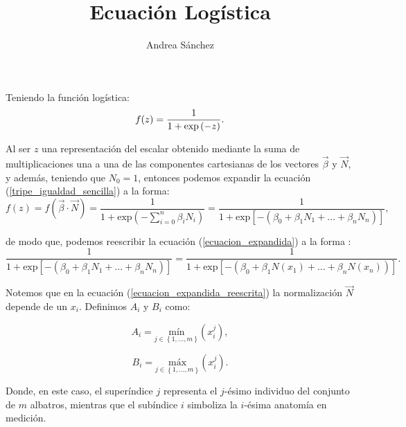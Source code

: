 \documentclass{article}
\begin{document}
\title{Ecuación Logística}
\author{Andrea Sánchez}
\maketitle
\begin{flushleft}

Teniendo la función logística:
\begin{equation}
    \label{tripe_igualdad_sencilla}
    f(z) = \frac{1}{1+\mbox{\mbox{exp}}\left ( -z\right )}.
\end{equation}

Al ser $z$ una representación del escalar obtenido mediante la suma de multiplicaciones una a una de las componentes cartesianas de los vectores $\vec{\beta}$ y $\vec{N}$, y además, teniendo que $N_{0}=1$, entonces podemos expandir la ecuación (\ref{tripe_igualdad_sencilla}) a la forma:
\begin{equation}
    \label{ecuacion_expandida}
    f(z) = f(\vec{\beta} \cdot \vec{N}) = \frac{1}{1+\mbox{exp}\left (-\sum_{i=0}^{n} \beta _{i}N_{i} \right )} = \frac{1}{1+\mbox{exp}\left [ -\left ( \beta _{0} + \beta _{1}N_{1}+...+\beta_{n}N_{n} \right ) \right ]} ,
\end{equation}

de modo que, podemos reescribir la ecuación (\ref{ecuacion_expandida}) a la forma :
\begin{equation}
    \label{ecuacion_expandida_reescrita}
    \frac{1}{1+\mbox{exp}\left [ -\left ( \beta _{0} + \beta _{1}N_{1}+...+\beta_{n}N_{n} \right ) \right ]} = \frac{1}{1+\mbox{exp}\left [ -\left ( \beta _{0} + \beta _{1}N(x_{1})+...+\beta_{n}N(x_{n})\right ) \right ]} .
\end{equation}

Notemos que en la ecuación (\ref{ecuacion_expandida_reescrita}) la normalización $\vec{N}$ depende de un $x_{i}$. Definimos $A_{i}$ y $B_{i}$ como:

\begin{equation}
    \label{maximos_A}
    A_{i}= \underset{j\in \left \{ 1,...,m \right \}}{\mbox{mín}}\left ( x_{i}^{j} \right ) ,
\end{equation}

\begin{equation}
    \label{minimos_B}
    B_{i}= \underset{j\in \left \{ 1,...,m \right \}}{\mbox{máx}}\left ( x_{i}^{j} \right ) .
\end{equation}

Donde, en este caso, el superíndice $j$ representa el $j$-ésimo individuo del conjunto de $m$ albatros, mientras que el subíndice $i$ simboliza la $i$-ésima anatomía en medición.


\end{flushleft}
\end{document}
